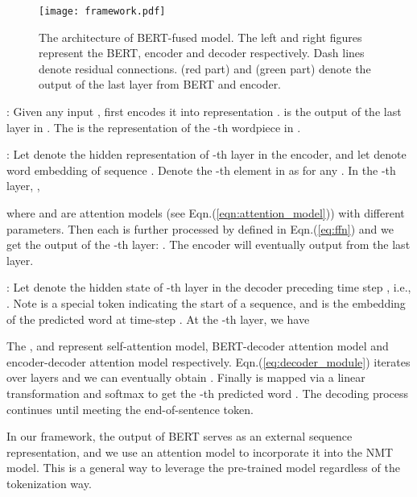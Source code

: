 \documentclass{article} \usepackage{iclr2020_conference,times}
\newcommand{\myeqref}[1]{Eqn.(\ref{#1})}
\begin{document}
\begin{figure}[!htbp]
\centering
\texttt{[image: framework.pdf]}
\caption{The architecture of BERT-fused model. The left and right figures represent the BERT, encoder and decoder respectively. Dash lines denote residual connections.  (red part) and  (green part) denote the output of the last layer from BERT and encoder.}
\label{fig:framework}
\end{figure}

: Given any input ,  first encodes it into representation .  is the output of the last layer in . The  is the representation of the -th wordpiece in . 

: Let  denote the hidden representation of -th layer in the encoder, and let  denote word embedding of sequence . Denote the -th element in  as  for any . In the -th layer, ,

where  and  are attention models (see Eqn.(\ref{eqn:attention_model})) with different parameters. Then each  is further processed by  defined in \myeqref{eq:ffn} and we get the output of the -th layer: . The encoder will eventually output  from the last layer.

: Let  denote the hidden state of -th layer in the decoder preceding time step , i.e., . Note  is a special token indicating the start of a sequence, and  is the embedding of the predicted word at time-step . At the -th layer, we have

The ,  and  represent self-attention model, BERT-decoder attention model and encoder-decoder attention model respectively. \myeqref{eq:decoder_module} iterates over layers and we can eventually obtain . Finally  is mapped via a linear transformation and softmax to get the -th predicted word . The decoding process continues until meeting the end-of-sentence token.

In our framework, the output of BERT serves as an external sequence representation, and we use an attention model to incorporate it into the NMT model. This is a general way to leverage the pre-trained model regardless of the tokenization way. 
\end{document}
